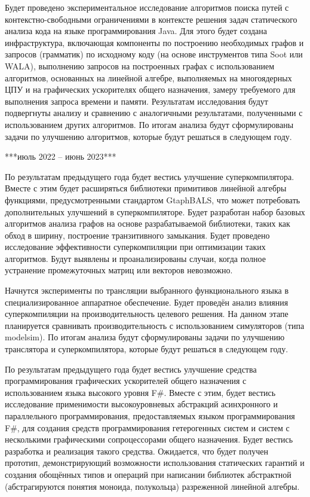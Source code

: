 \documentclass[12pt]{article}  %
\theoremstyle{remark}
\begin{document}
Будет проведено экспериментальное исследование алгоритмов поиска путей с контекстно-свободными ограничениями в контексте решения задач статического анализа кода на языке программирования Java. Для этого будет создана инфраструктура, включающая компоненты по построению необходимых графов и запросов (грамматик) по исходному коду (на основе инструментов типа Soot или WALA), выполнению запросов на построенных графах с использованием алгоритмов, основанных на линейной алгебре, выполняемых на многоядерных ЦПУ и на графических ускорителях общего назначения, замеру требуемого для выполнения запроса времени и памяти. Результатам исследования будут подвергнуты анализу и сравнению с аналогичными результатами, полученными с использованием других алгоритмов. По итогам анализа будут сформулированы задачи по улучшению алгоритмов, которые будут решаться в следующем году.


***июль 2022 -- июнь 2023***

По результатам предыдущего года будет вестись улучшение суперкомпилятора. Вместе с этим будет расширяться библиотеки примитивов линейной алгебры функциями, предусмотренными стандартом GtaphBALS, что может потребовать дополнительных улучшений в суперкомпиляторе. Будет разработан набор базовых алгоритмов анализа графов на основе разрабатываемой библиотеки, таких как обход в ширину, построение транзитивного замыкания. Будет проведено исследование эффективности суперкомпиляции при оптимизации таких алгоритмов. Будут выявлены и проанализированы случаи, когда полное устранение промежуточных матриц или векторов невозможно.

Начнутся эксперименты по трансляции выбранного функционального языка в специализированное аппаратное обеспечение. Будет проведён анализ влияния суперкомпиляции на производительность целевого решения. На данном этапе планируется сравнивать производительность с использованием симуляторов (типа modelsim). По итогам анализа будут сформулированы задачи по улучшению транслятора и суперкомпилятора, которые будут решаться в следующем году. 

По результатам предыдущего года будет вестись улучшение средства программирования графических ускорителей общего назначения с использованием языка высокого уровня F\#. Вместе с этим, будет вестись исследование применимости высокоуровневых абстракций асинхронного и параллельного программирования, предоставляемых языком программирования F\#, для создания средств программирования гетерогенных систем и систем с несколькими графическими сопроцессорами общего назначения. Будет вестись разработка и реализация такого средства. Ожидается, что будет получен прототип, демонстрирующий возможности использования статических гарантий и создания обощённых типов и операций при написании библиотек абстрактной (абстрагируются понятия моноида, полукольца) разреженной линейной алгебры.
\end{document}
